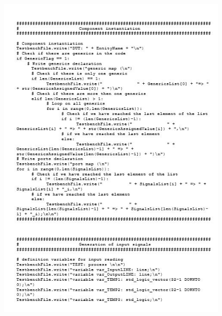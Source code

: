 \begin{figure}[!htb]
	\centering
	\includegraphics[scale=1]{immagini/tbgen5}
	\label{tbgen5}
\end{figure}
